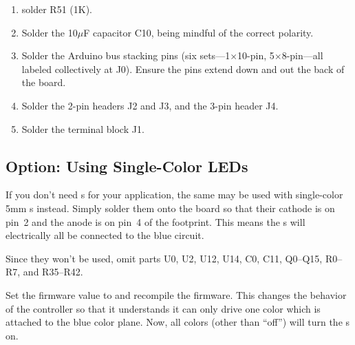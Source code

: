 \begin{enumerate}
		\begin{itemize}
			\item D512 (bottom): green (with R24=300$\Omega$)\footnote{Resistor values based on typical  voltage and current ratings. Check to see what is appropriate for your components.}
			\item D513: yellow (with R25=360$\Omega$)
			\item D514: yellow (with R26=360$\Omega$)
			\item D515: red (with R27=360$\Omega$)
			\item D516: red (with R28=360$\Omega$)
			\item D517: blue (with R29=300$\Omega$)
			\item D518: blue (with R30=300$\Omega$)
			\item D519 (top): white (with R31=300$\Omega$)
		\end{itemize}
	\item {} solder R51 (1K).
	\item {} Solder the 10$\mu$F capacitor C10, being mindful of the correct polarity. 
	\item Solder the Arduino bus stacking pins (six sets---1$\times$10-pin, 5$\times$8-pin---all labeled collectively at J0).
		Ensure the pins extend down and out the back of the board.
	\item Solder the 2-pin headers J2 and J3, and the 3-pin header J4.
	\item Solder the terminal block J1.
\end{enumerate}


\subsection{Option: Using Single-Color LEDs}
If you don't need  s for your application, the same 
may be used with single-color 5mm s instead. Simply solder them onto the board so
that their cathode is on pin~2 and the anode is on pin~4 of the  footprint. This
means the s will electrically all be connected to the blue circuit. 

Since they won't be used, omit parts U0, U2, U12, U14, C0, C11, Q0--Q15, R0--R7, and R35--R42.

Set the firmware value  to  and recompile the firmware. This
changes the behavior of the controller so that it understands it can only drive one color which
is attached to the blue color plane. Now, all colors (other than ``off'') will turn the s
on.

